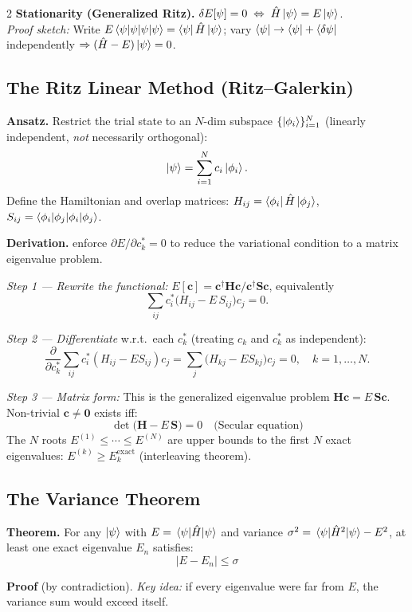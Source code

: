 \documentclass[9pt,a4paper]{article} %
\newcommand{\Hhat}{\hat{H}}
\begin{document}
\begin{multicols}{2}
\textbf{Stationarity (Generalized Ritz).} $\delta E[\psi]=0\;\Leftrightarrow\;\Hhat\ket{\psi}=E\ket{\psi}$.\\
\textit{Proof sketch:} Write $E\braket{\psi|\psi}=\bra{\psi}\Hhat\ket{\psi}$; vary $\bra{\psi}\to\bra{\psi}+\bra{\delta\psi}$ independently $\Rightarrow (\Hhat-E)\ket{\psi}=0$.

\subsection{The Ritz Linear Method (Ritz--Galerkin)}
\textbf{Ansatz.} Restrict the trial state to an $N$-dim subspace $\{\ket{\phi_i}\}_{i=1}^{N}$ (linearly independent, \emph{not} necessarily orthogonal):
\[
\ket{\psi}=\sum_{i=1}^{N}c_i\ket{\phi_i}.
\]
Define the Hamiltonian and overlap matrices: $H_{ij}=\bra{\phi_i}\Hhat\ket{\phi_j}$,\; $S_{ij}=\braket{\phi_i|\phi_j}$.

\textbf{Derivation.} enforce $\partial E/\partial c_k^*=0$ to reduce the variational condition to a matrix eigenvalue problem.

\emph{Step 1 — Rewrite the functional:}
$E[\mathbf{c}]={\mathbf{c}^\dagger\mathbf{H}\mathbf{c}}\big/{\mathbf{c}^\dagger\mathbf{S}\mathbf{c}}$, equivalently
\[
\sum_{ij}c_i^*\bigl(H_{ij}-E\,S_{ij}\bigr)c_j=0.
\]

\emph{Step 2 — Differentiate} w.r.t.\ each $c_k^*$ (treating $c_k$ and $c_k^*$ as independent):
\[
\frac{\partial}{\partial c_k^*}\sum_{ij}c_i^*(H_{ij}-ES_{ij})c_j
=\sum_{j}\bigl(H_{kj}-ES_{kj}\bigr)c_j=0,\quad k=1,\dots,N.
\]

\emph{Step 3 — Matrix form:} This is the generalized eigenvalue problem
$\mathbf{H}\mathbf{c}=E\,\mathbf{S}\mathbf{c}$.
Non-trivial $\mathbf{c}\neq\mathbf{0}$ exists iff:
\[
\boxed{\det\!\bigl(\mathbf{H}-E\,\mathbf{S}\bigr)=0 \quad\text{(Secular equation)}}
\]
The $N$ roots $E^{(1)}\le\cdots\le E^{(N)}$ are upper bounds to the first $N$ exact eigenvalues: $E^{(k)}\ge E_k^{\text{exact}}$ (interleaving theorem).

\subsection{The Variance Theorem}
\textbf{Theorem.} For any $\ket{\psi}$ with $E=\ev{\Hhat}{\psi}$ and variance $\sigma^2=\ev{\Hhat^2}{\psi}-E^2$, at least one exact eigenvalue $E_n$ satisfies:
\[
\boxed{|E-E_n|\le\sigma}
\]

\textbf{Proof} (by contradiction). \emph{Key idea:} if every eigenvalue were far from $E$, the variance sum would exceed itself.


\end{multicols}
\end{document}
